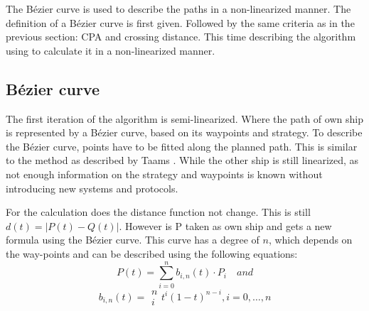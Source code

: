 The Bézier curve is used to describe the paths in a non-linearized manner. The definition of a Bézier curve is first given. Followed by the same criteria as in the previous section: \acf{CPA} and crossing distance. This time describing the algorithm using to calculate it in a non-linearized manner.

\subsection{Bézier curve}
The first iteration of the algorithm is semi-linearized. Where the path of own ship is represented by a Bézier curve, based on its waypoints and strategy. To describe the Bézier curve, points have to be fitted along the planned path. This is similar to the method as described by Taams \cite{Taams2018}. While the other ship is still linearized, as not enough information on the strategy and waypoints is known without introducing new systems and protocols.

For the calculation does the distance function not change. This is still $
d(t) = |P(t) - Q(t)|$. However is P taken as own ship and gets a new formula using the Bézier curve. This curve has a degree of $n$, which depends on the way-points and can be described using the following equations:
\begin{equation}
P(t) = \sum\limits_{i=0}^n b_{i,n}(t) \cdot P_i \quad and
\end{equation}
\begin{equation}
b_{i,n}(t) = \begin{array}{c} n \\ i \end{array} t^i(1-t)^{n-i}, i = 0,\dots,n
\end{equation}

